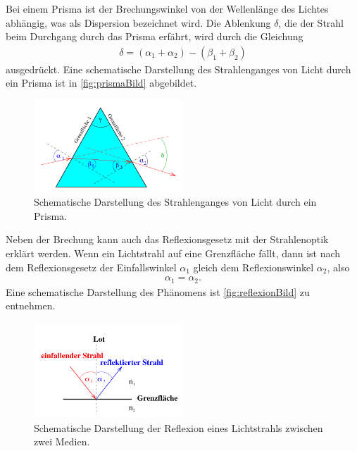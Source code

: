 \noindent
Bei einem Prisma ist der Brechungswinkel von der Wellenlänge des Lichtes abhängig, was als Dispersion bezeichnet wird. Die Ablenkung $\delta$, die der Strahl beim Durchgang durch das Prisma erfährt,
wird durch die Gleichung
\begin{align}
    \delta = (\alpha_1+\alpha_2) - (\beta_1 + \beta_2)
    \label{eqn:prismaWinkel}
\end{align}
ausgedrückt. Eine schematische Darstellung des Strahlenganges von Licht durch ein Prisma ist in \autoref{fig:prismaBild} abgebildet.

\begin{figure}[H]
    \centering
    \includegraphics[width=0.5\textwidth]{data/prisma.png}
    \caption{Schematische Darstellung des Strahlenganges von Licht durch ein Prisma\cite{Anleitung400}.}
    \label{fig:prismaBild}
\end{figure}

\noindent
Neben der Brechung kann auch das Reflexionsgesetz mit der Strahlenoptik erklärt werden. Wenn ein Lichtstrahl auf eine Grenzfläche fällt, dann ist nach dem Reflexionsgesetz der Einfallswinkel $\alpha_1$ gleich dem Reflexionswinkel $\alpha_2$, also
\begin{align}
    \label{eqn:einfallAusfall}
    \alpha_1 = \alpha_2.
\end{align}
Eine schematische Darstellung des Phänomens ist \autoref{fig:reflexionBild} zu entnehmen. \newline

\begin{figure}[H]
    \centering
    \includegraphics[width=0.5\textwidth]{data/reflexion.png}
    \caption{Schematische Darstellung der Reflexion eines Lichtstrahls zwischen zwei Medien\cite{Anleitung400}.}
    \label{fig:reflexionBild}
\end{figure}

